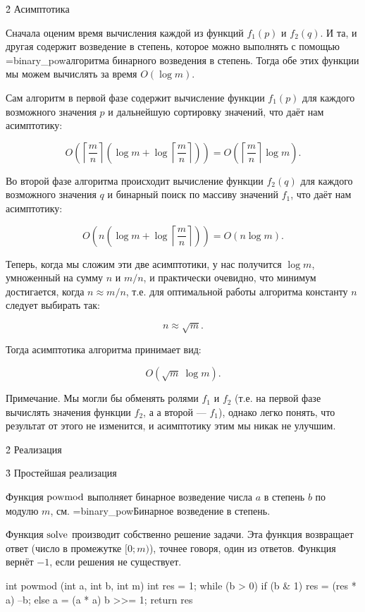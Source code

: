 \h2{ Асимптотика }

Сначала оценим время вычисления каждой из функций $f_1(p)$ и $f_2(q)$. И та, и другая содержит возведение в степень, которое можно выполнять с помощью \algohref=binary_pow{алгоритма бинарного возведения в степень}. Тогда обе этих функции мы можем вычислять за время $O(\log m)$.

Сам алгоритм в первой фазе содержит вычисление функции $f_1(p)$ для каждого возможного значения $p$ и дальнейшую сортировку значений, что даёт нам асимптотику:

$$ O\left( \left\lceil \frac{m}{n} \right\rceil \left( \log m + \log \left\lceil \frac{m}{n} \right\rceil \right) \right) = O\left( \left\lceil \frac{m}{n} \right\rceil \log m \right). $$

Во второй фазе алгоритма происходит вычисление функции $f_2(q)$ для каждого возможного значения $q$ и бинарный поиск по массиву значений $f_1$, что даёт нам асимптотику:

$$ O\left( n \left( \log m + \log \left\lceil \frac{m}{n} \right\rceil \right) \right) = O\left( n \log m \right). $$

Теперь, когда мы сложим эти две асимптотики, у нас получится $\log m$, умноженный на сумму $n$ и $m/n$, и практически очевидно, что минимум достигается, когда $n \approx m/n$, т.е. для оптимальной работы алгоритма константу $n$ следует выбирать так:

$$ n \approx \sqrt{m}. $$

Тогда асимптотика алгоритма принимает вид:

$$ O\left( \sqrt{m} ~ \log m \right). $$

Примечание. Мы могли бы обменять ролями $f_1$ и $f_2$ (т.е. на первой фазе вычислять значения функции $f_2$, а а второй --- $f_1$), однако легко понять, что результат от этого не изменится, и асимптотику этим мы никак не улучшим.


\h2{ Реализация }


\h3{ Простейшая реализация }

Функция $\rm powmod$ выполняет бинарное возведение числа $a$ в степень $b$ по модулю $m$, см. \algohref=binary_pow{Бинарное возведение в степень}.

Функция $\rm solve$ производит собственно решение задачи. Эта функция возвращает ответ (число в промежутке $[0;m)$), точнее говоря, один из ответов. Функция вернёт $-1$, если решения не существует.

\code
int powmod (int a, int b, int m) {
	int res = 1;
	while (b > 0)
		if (b & 1) {
			res = (res * a) %
			--b;
		}
		else {
			a = (a * a) %
			b >>= 1;
		}
	return res %
}

